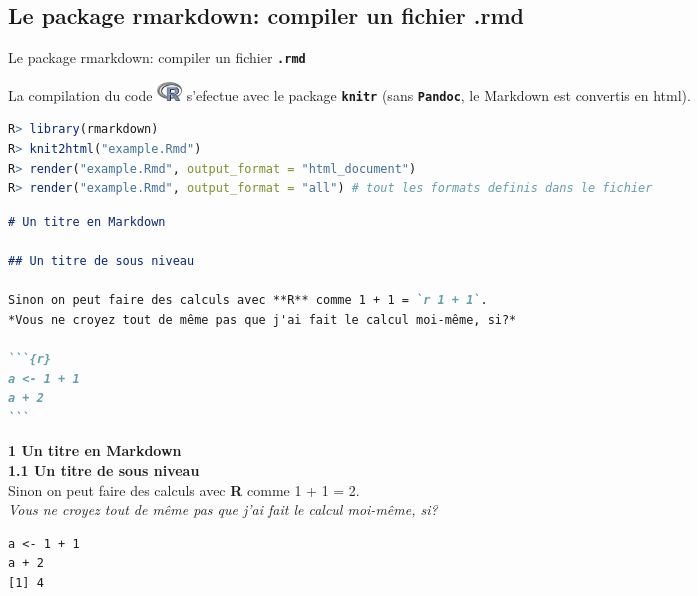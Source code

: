 \documentclass[10pt, xcolors={RGB}, hyperref={pdfpagelabels=false,
        colorlinks=true,
        linkcolor=black,
        urlcolor=black,
        citecolor=black,
        filecolor=black,
        menucolor=black,
        pdftex=true,
        bookmarks=true,
        bookmarksopen=true,
        hyperfootnotes=true}]{beamer}
\newcommand\cmdb[1]{\texttt{\color{dodgerblue}\textbf{#1}}}
\newcommand{\R}{\protect\includegraphics[height=0.5cm, keepaspectratio]{./Logos/logo_R2.png}}
\begin{document}
\subsection{Le package rmarkdown: compiler un fichier .rmd}
\begin{frame}[containsverbatim]{Le package rmarkdown: compiler un fichier \cmdb{.rmd}}
\par{La compilation du code \R{} s'efectue avec le package \cmdb{knitr} (sans \cmdb{Pandoc}, le Markdown est convertis en html).}
\vspace{-2ex}
\begin{lstlisting}[language=R, lineskip=0ex]
R> library(rmarkdown)
R> knit2html("example.Rmd")
R> render("example.Rmd", output_format = "html_document")
R> render("example.Rmd", output_format = "all") # tout les formats definis dans le fichier
\end{lstlisting}
\vspace{-3ex}
\begin{multicols}{2}
\begin{lstlisting}[language=md, xleftmargin=9mm, xrightmargin=2mm, lineskip=0ex]
# Un titre en Markdown

## Un titre de sous niveau

Sinon on peut faire des calculs avec **R** comme 1 + 1 = `r 1 + 1`.
*Vous ne croyez tout de même pas que j'ai fait le calcul moi-même, si?*

```{r}
a <- 1 + 1
a + 2
```
\end{lstlisting}
\vfill
\columnbreak
\vspace*{\fill}
{\large\textbf{1 Un titre en Markdown}}\\\vspace{1ex}
{\normalsize\textbf{1.1 Un titre de sous niveau}}\\\vspace{1ex}
{\tiny Sinon on peut faire des calculs avec \textbf{R} comme 1 + 1 = 2.\\}\vspace{-1ex}
{\tiny \emph{Vous ne croyez tout de même pas que j'ai fait le calcul moi-même, si?}}
\vspace{-3ex}
\begin{lstlisting}[xleftmargin=2mm, xrightmargin=9mm, backgroundcolor=\color{white}, rulecolor=\color{white}, lineskip=0ex]
a <- 1 + 1
a + 2
[1] 4
\end{lstlisting}
\end{multicols}
\end{frame}
\end{document}
